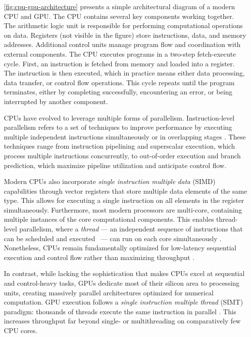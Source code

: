 \documentclass[english,12pt,a4paper,pdftex,sci,utf8]{aaltothesis}
\begin{document}
\cref{fig:cpu-gpu-architecture} presents a simple architectural diagram of a modern CPU and GPU. The CPU contains several key components working together. The arithmetic logic unit is responsible for performing computational operations on data. Registers (not visible in the figure) store instructions, data, and memory addresses. Additional control units manage program flow and coordination with external components. The CPU executes programs in a two-step fetch-execute cycle. First, an instruction is fetched from memory and loaded into a register. The instruction is then executed, which in practice means either data processing, data transfer, or control flow operations. This cycle repeats until the program terminates, either by completing successfully, encountering an error, or being interrupted by another component.

CPUs have evolved to leverage multiple forms of parallelism. Instruction-level parallelism refers to a set of techniques to improve performance by executing multiple independent instructions simultaneously or in overlapping stages \cite{hennessy2011computer, suomela_ppc}. These techniques range from instruction pipelining and superscalar execution, which process multiple instructions concurrently, to out-of-order execution and branch prediction, which maximize pipeline utilization and anticipate control flow.

Modern CPUs also incorporate \emph{single instruction multiple data} (SIMD) capabilities through vector registers that store multiple data elements of the same type. This allows for executing a single instruction on all elements in the register simultaneously. Furthermore, most modern processors are multi-core, containing multiple instances of the core computational components. This enables thread-level parallelism, where a \emph{thread} --- an independent sequence of instructions that can be scheduled and \mbox{executed \cite{stallings2011operating}} --- can run on each core simultaneously \cite{hennessy2011computer, suomela_ppc}. Nonetheless, CPUs remain fundamentally optimized for low-latency sequential execution and control flow rather than maximizing throughput \cite{hennessy2011computer, suomela_ppc}.

In contrast, while lacking the sophistication that makes CPUs excel at sequential and control-heavy tasks, GPUs dedicate most of their silicon area to processing units, creating massively parallel architectures optimized for numerical computation. GPU execution follows a \emph{single instruction multiple thread} (SIMT) paradigm: thousands of threads execute the same instruction in parallel \cite{cuda2025guide}. This increases throughput far beyond single- or multithreading on comparatively few CPU cores.
\end{document}
